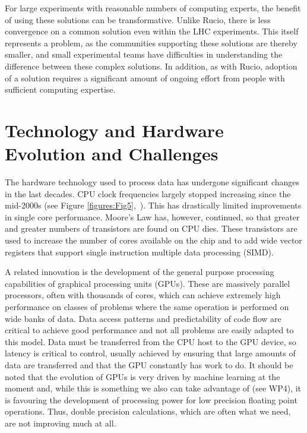 For large experiments with reasonable numbers of computing experts, the benefit of using these solutions can be transformative. Unlike Rucio, there is less convergence on a common solution even within the LHC experiments. This itself represents a problem, as the communities supporting these solutions are thereby smaller, and small experimental teams have difficulties in understanding the difference between these complex solutions. In addition, as with Rucio, adoption of a solution requires a significant amount of ongoing effort from people with sufficient computing expertise.



\section{Technology and Hardware Evolution and Challenges}


The hardware technology used to process data has undergone significant changes in the last decades. CPU clock frequencies largely stopped increasing since the mid-2000s (see Figure \ref{figures:Fig5},~\cite{KRupp_Microprocessor_Data}). This has drastically limited improvements in single core performance. Moore's Law has, however, continued, so that greater and greater numbers of transistors are found on CPU dies. These transistors are used to increase the number of cores available on the chip and to add wide vector registers that support single instruction multiple data processing (SIMD).

A related innovation is the development of the general purpose processing capabilities of graphical processing units (GPUs). These are massively parallel processors, often with thousands of cores, which can achieve extremely high performance on classes of problems where the same operation is performed on wide banks of data. Data access patterns and predictability of code flow are critical to achieve good performance and not all problems are easily adapted to this model. Data must be transferred from the CPU host to the GPU device, so latency is critical to control, usually achieved by ensuring that large amounts of data are transferred and that the GPU constantly has work to do. It should be noted that the evolution of GPUs is very driven by machine learning at the moment and, while this is something we also can take advantage of (see WP4), it is favouring the development of processing power for low precision floating point operations. Thus, double precision calculations, which are often what we need, are not improving much at all.

